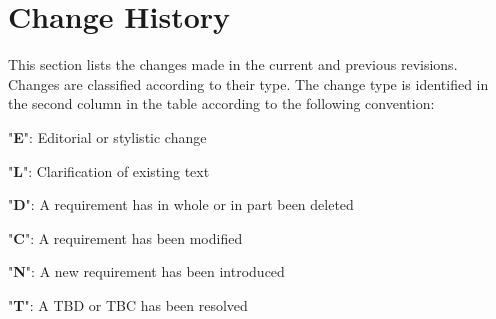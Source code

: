 \documentclass{pnp_article}
\begin{document}
\newenvironment{cr_par}[2]
{
\begin{longtable}{|l|p{9.5cm}|}
\caption{#2}\label{tab:Par-#1} \\
\hline
\rowcolor{light-gray}
\textbf{Name} & \textbf{Description}\\
\hline\hline
\endfirsthead
\rowcolor{light-gray}
\textbf{Name} & \textbf{Description}\\
\hline\hline
\endhead
\DTLforeach*[\DTLiseq{\cat}{#1}]{dbPar}{\cat=Category,\name=Name,\desc=Desc}
{\DTLiffirstrow{}{\\\hline}\texttt{\name} & \desc}\\\hline
}
{\end{longtable}}




\tableofcontents
\listoffigures
\listoftables


\section{Change History}

This section lists the changes made in the current and previous revisions. Changes are classified according to their type. The change type is identified in the second column in the table according to the following convention:

\begin{fw_itemize}
\item "\textbf{E}": Editorial or stylistic change
\item "\textbf{L}": Clarification of existing text
\item "\textbf{D}": A requirement has in whole or in part been deleted
\item "\textbf{C}": A requirement has been modified
\item "\textbf{N}": A new requirement has been introduced
\item "\textbf{T}": A TBD or TBC has been resolved
\end{fw_itemize}
\end{document}
